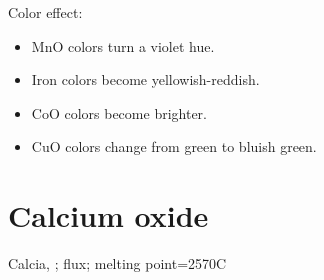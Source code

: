 Color effect:
\begin{itemize}
\item MnO colors turn a violet hue.
\item Iron colors become yellowish-reddish.
\item CoO colors become brighter.
\item CuO colors change from green to bluish green.
\end{itemize}
\section{Calcium oxide}
Calcia, ; flux; melting point=2570\degree C

